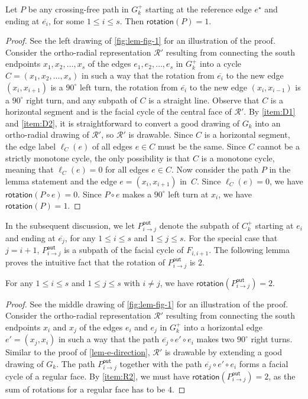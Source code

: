 \documentclass{theoretics}
\newcommand{\Pout}{P^{\mathsf{out}}}
\newcommand{\RR}{\mathcal{R}}
\newcommand{\rotation}{\mathsf{rotation}}
\newcommand{\eref}{e^\star}
\begin{document}
\begin{lemma}\label{lem-e-direction}
Let $P$ be any crossing-free path in $G_k^+$ starting at the reference edge $\eref$ and ending at $\overline{e_i}$, for some $1 \leq i \leq s$. Then $\rotation(P) = 1$. 
\end{lemma}
\begin{proof}
See the left drawing of \cref{fig:lem-fig-1} for an illustration of the proof.
 Consider the ortho-radial representation $\RR'$ resulting from connecting the south endpoints $x_1, x_2, \ldots, x_s$ of the edges $e_1, e_2, \ldots, e_s$ in $G_k^+$ into a cycle $C = (x_1, x_2, \ldots, x_s)$ in such a way that the rotation from $\overline{e_i}$ to the new edge $(x_i, x_{i+1})$ is a $90^\circ$ left turn,   the rotation from $\overline{e_i}$ to the new edge $(x_i, x_{i-1})$ is a $90^\circ$ right turn, and any subpath of $C$ is a straight line.
 Observe that $C$ is a horizontal segment and is the facial cycle of the central face of $\RR'$. By \ref{item:D1} and \ref{item:D2}, it is straightforward to convert a good drawing of $G_k$ into an ortho-radial drawing of $\RR'$, so $\RR'$ is drawable. Since $C$ is a horizontal segment, the edge label  $\ell_C(e)$ of all edges $e \in C$  must be the same. Since $C$ cannot be a strictly monotone cycle, the only possibility is that $C$ is a monotone cycle, meaning that $\ell_C(e) = 0$ for all edges $e \in C$.  Now consider the path $P$ in the lemma statement and the edge $e=(x_i, x_{i+1})$ in~$C$.
 Since $\ell_C(e) = 0$, we  have $\rotation(P \circ e) = 0$. Since $P \circ e$ makes a $90^\circ$ left turn at $x_i$, we have $\rotation(P) = 1$. 
\end{proof}


In the subsequent discussion, we let $\Pout_{i\rightarrow j}$ denote the subpath of $C_k^+$ starting at $e_i$ and ending at $\overline{e_j}$, for any  $1 \leq i \leq s$ and $1 \leq j \leq s$.  For the special case that $j=i+1$, $\Pout_{i\rightarrow j}$ is a subpath of the facial cycle of $F_{i,i+1}$.  The following lemma proves the intuitive fact that the rotation of 
$\Pout_{i\rightarrow j}$ is $2$.

\begin{lemma}\label{lem-rotation-aux}
For any $1 \leq i \leq s$ and $1 \leq j \leq s$ with $i \neq j$, we have $\rotation(\Pout_{i\rightarrow j}) = 2$.
\end{lemma}
\begin{proof}
See the middle drawing of \cref{fig:lem-fig-1} for an illustration of the proof.
 Consider the ortho-radial representation $\RR'$ resulting from connecting the south endpoints $x_i$ and $x_j$ of the edges $e_i$ and  $e_j$ in $G_k^+$ into a horizontal edge $e'=(x_j, x_i)$ in such a way that the path $\overline{e_j} \circ e' \circ e_i$ makes two $90^\circ$ right turns. Similar to the proof of  \cref{lem-e-direction}, $\RR'$ is drawable by extending a good drawing of $G_k$.
 The path $\Pout_{i\rightarrow j}$ together with the path $\overline{e_j} \circ e' \circ e_i$ forms a facial cycle  of a regular face. By \ref{item:R2}, we must have $\rotation(\Pout_{i\rightarrow j}) = 2$, as the sum of rotations for a regular face has to be $4$. 
\end{proof}
\end{document}
